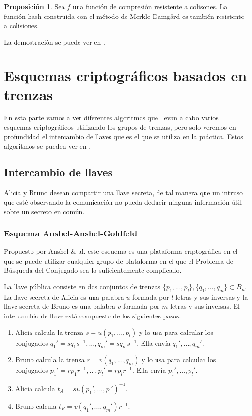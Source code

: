 \documentclass[12pt]{book}
\theoremstyle{definition}
\newtheorem{prop}{Proposición}[section]
\begin{document}
\begin{prop}
Sea $f$ una función de compresión resistente a colisones. La función hash construida con el método de Merkle-Damg\r{a}rd es también resistente a colisiones.
\end{prop}
La demostración se puede ver en \cite{in_cr}.



\section{Esquemas criptográficos basados en trenzas}

En esta parte vamos a ver diferentes algoritmos que llevan a cabo varios esquemas criptográficos utilizando los grupos de trenzas, pero solo veremos en profundidad el intercambio de llaves que es el que se utiliza en la práctica. Estos algoritmos se pueden ver en \cite{Deh}.

\subsection{Intercambio de llaves}
Alicia y Bruno desean compartir una llave secreta, de tal manera que un intruso que esté observando la comunicación no pueda deducir ninguna información útil sobre un secreto en común.

\subsubsection*{Esquema Anshel-Anshel-Goldfeld}
Propuesto por Anshel \& al. \cite{AAG} este esquema es una plataforma criptográfica en el que se puede utilizar cualquier grupo de plataforma en el que el Problema de Búsqueda del Conjugado sea lo suficientemente complicado.

La llave pública consiste en dos conjuntos de trenzas $\{p_1,...,p_l\},\{q_1,...,q_m\}\subset B_n$. La llave secreta de Alicia es una palabra $u$ formada por $l$ letras y sus inversas y la llave secreta de Bruno es una palabra $v$ formada por $m$ letras y sus inversas. El intercambio de llave está compuesto de los siguientes pasos:

\begin{enumerate}
\item Alicia calcula la trenza $s = u(p_1,...,p_l)$ y lo usa para calcular los conjugados $q_1'=sq_1s^{-1},...,q_m'=sq_ms^{-1}$. Ella envía $q_1',...,q_m'.$
\item Bruno calcula la trenza $r = v(q_1,...,q_m)$ y lo usa para calcular los conjugados $p_1'=rp_1r^{-1},...,p_l'=rp_lr^{-1}$. Ella envía $p_1',...,p_l'.$
\item Alicia calcula $t_A = su(p_1',...,p_l')^{-1}$.
\item Bruno calcula $t_B = v(q_1',...,q_m')r^{-1}$.
\end{enumerate}
\end{document}
